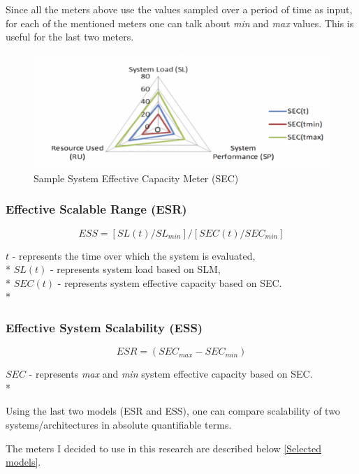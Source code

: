 \documentclass{uvamscse}
\begin{document}
Since all the meters above use the values sampled over a period of time as input, for each of the mentioned meters one can talk about \textit{min} and \textit{max} values. This is useful for the last two meters.

\begin{figure}[h]
\centering
\includegraphics[scale=0.3]{sec}
\caption{Sample System Effective Capacity Meter (SEC)}
\label{figure:sec}
\end{figure}

\subsubsection{Effective Scalable Range (ESR)}
\begin{center}
  $$ESS = [SL(t) / SL_{min}] / [SEC(t) / SEC_{min}]$$
\end{center}
  \texttt{$t$} - represents the time over which the system is evaluated, \\*
  \texttt{$SL(t)$} - represents system load based on SLM, \\*
  \texttt{$SEC(t)$} - represents system effective capacity based on SEC. \\*

\subsubsection{Effective System Scalability (ESS)}
\begin{center}
  $$ESR = (SEC_{max} - SEC_{min})$$
\end{center}
  \texttt{$SEC$} - represents \textit{max} and \textit{min} system effective capacity based on SEC. \\*

Using the last two models (ESR and ESS), one can compare scalability of two systems/architectures in absolute quantifiable terms.

The meters I decided to use in this research are described below \ref{Selected models}.
\end{document}
